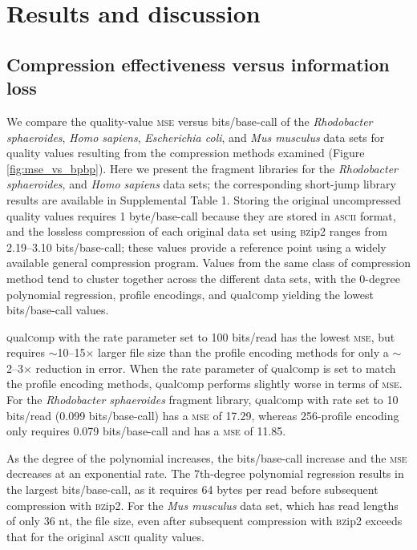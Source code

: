 \documentclass{bmcart}
\begin{document}
\section*{Results and discussion}

\subsection*{Compression effectiveness versus information loss}

We compare the quality-value \textsc{mse} versus bits/base-call of the
\textit{Rhodobacter sphaeroides}, \textit{Homo sapiens},
\textit{Escherichia coli}, and \textit{Mus musculus} data sets for
quality values resulting from the compression methods examined (Figure
\ref{fig:mse_vs_bpbp}). Here we present the fragment libraries for the
\textit{Rhodobacter sphaeroides}, and \textit{Homo sapiens} data sets;
the corresponding short-jump library results are available in
Supplemental Table 1. Storing the original uncompressed quality values
requires 1 byte/base-call because they are stored in \textsc{ascii}
format, and the lossless compression of each original data set using
\textsc{bz}ip2 ranges from 2.19--3.10 bits/base-call; these values
provide a reference point using a widely available general compression
program. Values from the same class of compression method tend to
cluster together across the different data sets, with the 0-degree
polynomial regression, profile encodings, and
\textsc{q}ual\textsc{c}omp yielding the lowest bits/base-call values.

\textsc{q}ual\textsc{c}omp with the rate parameter set to 100
bits/read has the lowest \textsc{mse}, but requires
$\sim$10--15$\times$ larger file size than the profile encoding
methods for only a $\sim$2--3$\times$ reduction in error. When the
rate parameter of \textsc{q}ual\textsc{c}omp is set to match the
profile encoding methods, \textsc{q}ual\textsc{c}omp performs slightly
worse in terms of \textsc{mse}. For the \textit{Rhodobacter
  sphaeroides} fragment library, \textsc{q}ual\textsc{c}omp with rate
set to 10 bits/read (0.099 bits/base-call) has a \textsc{mse} of
17.29, whereas 256-profile encoding only requires 0.079 bits/base-call
and has a \textsc{mse} of 11.85.

As the degree of the polynomial increases, the bits/base-call increase
and the \textsc{mse} decreases at an exponential rate. The 7th-degree
polynomial regression results in the largest bits/base-call, as it
requires 64 bytes per read before subsequent compression with
\textsc{bz}ip2. For the \textit{Mus musculus} data set, which has read
lengths of only 36 nt, the file size, even after subsequent
compression with \textsc{bz}ip2 exceeds that for the original
\textsc{ascii} quality values.
\end{document}
